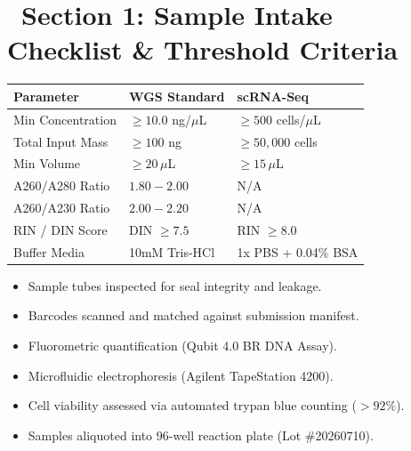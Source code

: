 \documentclass[10pt,a4paper]{article}
\begin{document}
\vspace{4pt}

\section{\faClipboardCheck\ Section 1: Sample Intake Checklist \& Threshold Criteria}

\begin{minipage}[t]{0.48\linewidth}
  \begin{tcolorbox}[
    title={\small\bfseries\faSlidersH\ Technical Acceptance Criteria},
    colback=white,
    colframe=PrimaryBlue,
    coltitle=white,
    arc=2pt,
    boxrule=0.5pt,
    top=4pt, bottom=4pt, left=6pt, right=6pt
  ]
    \fontsize{8pt}{10.5pt}\selectfont
    \begin{tabular}{@{}l l l@{}}
      \textbf{Parameter} & \textbf{WGS Standard} & \textbf{scRNA-Seq} \\
      \hline
      Min Concentration & $\ge 10.0$ ng/$\mu$L & $\ge 500$ cells/$\mu$L \\
      Total Input Mass & $\ge 100$ ng & $\ge 50,000$ cells \\
      Min Volume & $\ge 20\,\mu$L & $\ge 15\,\mu$L \\
      A260/A280 Ratio & $1.80 - 2.00$ & N/A \\
      A260/A230 Ratio & $2.00 - 2.20$ & N/A \\
      RIN / DIN Score & DIN $\ge 7.5$ & RIN $\ge 8.0$ \\
      Buffer Media & 10mM Tris-HCl & 1x PBS + 0.04\% BSA \\
    \end{tabular}
  \end{tcolorbox}
\end{minipage}%
\hfill
\begin{minipage}[t]{0.48\linewidth}
  \begin{tcolorbox}[
    title={\small\bfseries\faCheckCircle\ Intake Quality Assurance Log},
    colback=white,
    colframe=TealAccent,
    coltitle=white,
    arc=2pt,
    boxrule=0.5pt,
    top=4pt, bottom=4pt, left=6pt, right=6pt
  ]
    \fontsize{8pt}{10.5pt}\selectfont
    \begin{itemize}[leftmargin=12pt, itemsep=2pt, label={\color{PassGreen}\faCheck}]
      \item Sample tubes inspected for seal integrity and leakage.
      \item Barcodes scanned and matched against submission manifest.
      \item Fluorometric quantification (Qubit 4.0 BR DNA Assay).
      \item Microfluidic electrophoresis (Agilent TapeStation 4200).
      \item Cell viability assessed via automated trypan blue counting ($>92\%$).
      \item Samples aliquoted into 96-well reaction plate (Lot \#20260710).
    \end{itemize}
  \end{tcolorbox}
\end{minipage}
\end{document}
